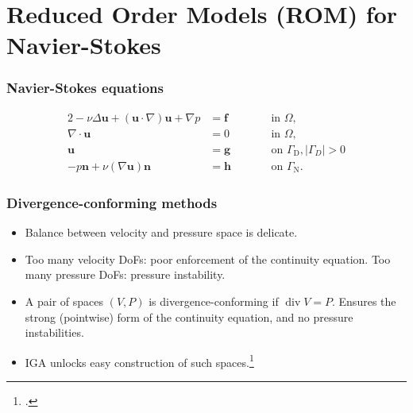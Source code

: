 \documentclass{beamer}
\begin{document}
\section{Reduced Order Models (ROM) for Navier-Stokes}

\begin{frame}
  \frametitle{Navier-Stokes equations}

  \begin{alignat*}{2}
    -\nu \Delta \bm u + (\bm u \cdot \nabla) \bm u + \nabla p &= \bm f && \qquad \text{in } \Omega, \\
    \nabla \cdot \bm u &= 0 && \qquad \text{in } \Omega, \\
    \bm u &= \bm g && \qquad \text{on } \Gamma_\text{D}, |\Gamma_D| > 0 \\
    -p \bm n + \nu (\nabla \bm u) \bm n &= \bm h && \qquad \text{on } \Gamma_\text{N}.
  \end{alignat*}
\end{frame}

\begin{frame}
  \frametitle{Divergence-conforming methods}

  \begin{itemize}
  \item Balance between velocity and pressure space is delicate.
  \item Too many velocity DoFs: poor enforcement of the continuity equation. Too many pressure DoFs:
    pressure instability.
  \item A pair of spaces $(V,P)$ is divergence-conforming if $\operatorname{div} V = P$. Ensures the strong
    (pointwise) form of the continuity equation, and no pressure instabilities.
  \item IGA unlocks easy construction of such spaces.\footcite{Buffa2010iae,Evans2013idc1}
  \end{itemize}
\end{frame}
\end{document}

